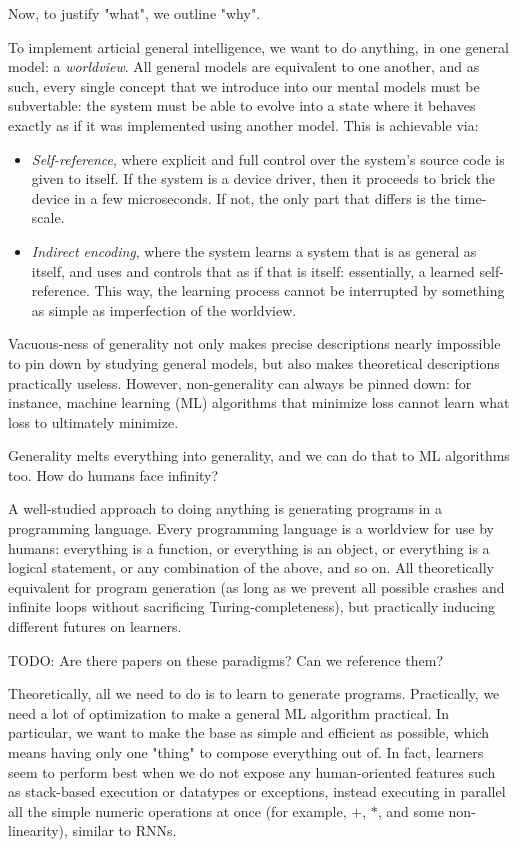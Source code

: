 \documentclass{article}
\begin{document}
Now, to justify "what", we outline "why".

To implement articial general intelligence, we want to do anything, in one general model: a \textit{worldview}. All general models are equivalent to one another, and as such, every single concept that we introduce into our mental models must be subvertable: the system must be able to evolve into a state where it behaves exactly as if it was implemented using another model. This is achievable via:

\begin{itemize}
\item \textit{Self-reference}, where explicit and full control over the system's source code is given to itself. If the system is a device driver, then it proceeds to brick the device in a few microseconds. If not, the only part that differs is the time-scale.
\item \textit{Indirect encoding}, where the system learns a system that is as general as itself, and uses and controls that as if that is itself: essentially, a learned self-reference. This way, the learning process cannot be interrupted by something as simple as imperfection of the worldview.
\end{itemize}

Vacuous-ness of generality not only makes precise descriptions nearly impossible to pin down by studying general models, but also makes theoretical descriptions practically useless. However, non-generality can always be pinned down: for instance, machine learning (ML) algorithms that minimize loss cannot learn what loss to ultimately minimize.

Generality melts everything into generality, and we can do that to ML algorithms too. How do humans face infinity?

A well-studied approach to doing anything is generating programs in a programming language. Every programming language is a worldview for use by humans: everything is a function, or everything is an object, or everything is a logical statement, or any combination of the above, and so on. All theoretically equivalent for program generation (as long as we prevent all possible crashes and infinite loops without sacrificing Turing-completeness), but practically inducing different futures on learners.

    TODO: Are there papers on these paradigms? Can we reference them?

Theoretically, all we need to do is to learn to generate programs. Practically, we need a lot of optimization to make a general ML algorithm practical. In particular, we want to make the base as simple and efficient as possible, which means having only one "thing" to compose everything out of. In fact, learners seem to perform best when we do not expose any human-oriented features such as stack-based execution or datatypes or exceptions, instead executing in parallel all the simple numeric operations at once (for example, $+$, $*$, and some non-linearity), similar to RNNs.
\end{document}
